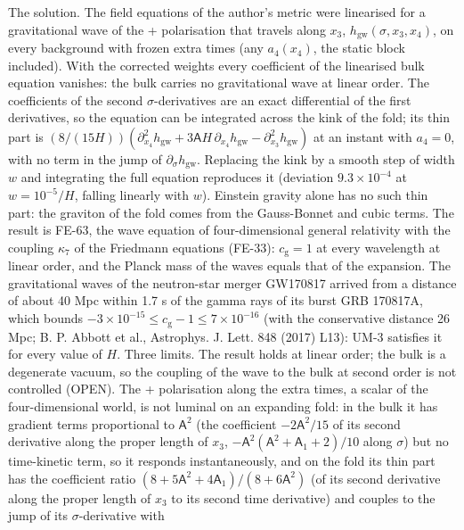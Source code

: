 \documentclass[
  10pt,
]{article}
\begin{document}
The solution. The field equations of the author's metric were linearised
for a gravitational wave of the + polarisation that travels along
\(x_3\), \(h_{\mathrm{gw}}(\sigma, x_3, x_4)\), on every background with
frozen extra times (any \(a_4(x_4)\), the static block included). With
the corrected weights every coefficient of the linearised bulk equation
vanishes: the bulk carries no gravitational wave at linear order. The
coefficients of the second \(\sigma\)-derivatives are an exact
differential of the first derivatives, so the equation can be integrated
across the kink of the fold; its thin part is
\((8/(15H))(\partial_{x_4}^2h_{\mathrm{gw}} + 3\mathsf{A}H\,\partial_{x_4}h_{\mathrm{gw}} - \partial_{x_3}^2h_{\mathrm{gw}})\)
at an instant with \(a_4 = 0\), with no term in the jump of
\(\partial_\sigma h_{\mathrm{gw}}\). Replacing the kink by a smooth step
of width \(w\) and integrating the full equation reproduces it
(deviation \(9.3\times10^{-4}\) at \(w = 10^{-5}/H\), falling linearly
with \(w\)). Einstein gravity alone has no such thin part: the graviton
of the fold comes from the Gauss-Bonnet and cubic terms. The result is
FE-63, the wave equation of four-dimensional general relativity with the
coupling \(\kappa_7\) of the Friedmann equations (FE-33):
\(c_{\mathrm{g}} = 1\) at every wavelength at linear order, and the
Planck mass of the waves equals that of the expansion. The gravitational
waves of the neutron-star merger GW170817 arrived from a distance of
about 40 Mpc within 1.7 s of the gamma rays of its burst GRB 170817A,
which bounds
\(-3\times10^{-15} \le c_{\mathrm{g}} - 1 \le 7\times10^{-16}\) (with
the conservative distance 26 Mpc; B. P. Abbott et al., Astrophys. J.
Lett. 848 (2017) L13): UM-3 satisfies it for every value of \(H\). Three
limits. The result holds at linear order; the bulk is a degenerate
vacuum, so the coupling of the wave to the bulk at second order is not
controlled (OPEN). The + polarisation along the extra times, a scalar of
the four-dimensional world, is not luminal on an expanding fold: in the
bulk it has gradient terms proportional to \(\mathsf{A}^2\) (the
coefficient \(-2\mathsf{A}^2/15\) of its second derivative along the
proper length of \(x_3\),
\(-\mathsf{A}^2(\mathsf{A}^2 + \mathsf{A}_1 + 2)/10\) along \(\sigma\))
but no time-kinetic term, so it responds instantaneously, and on the
fold its thin part has the coefficient ratio
\((8 + 5\mathsf{A}^2 + 4\mathsf{A}_1)/(8 + 6\mathsf{A}^2)\) (of its
second derivative along the proper length of \(x_3\) to its second time
derivative) and couples to the jump of its \(\sigma\)-derivative with
\end{document}
